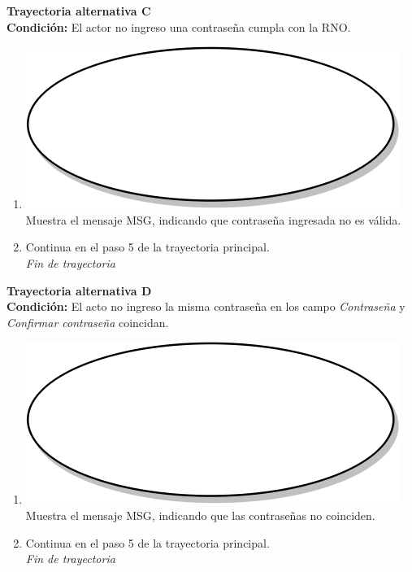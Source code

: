 \textbf{Trayectoria alternativa C} \label{cu2_ta_c}\\
\textbf{Condición:} El actor no ingreso una contraseña cumpla con la RNO.\\
 \begin{enumerate}[label=C\arabic*]
    \item {\includegraphics[scale=.05]{Capitulo3/img/proceso.png} Muestra el mensaje MSG, indicando que contraseña ingresada no es válida.}
    \item {Continua en el paso 5 de la trayectoria principal.} \\
    \textit{Fin de trayectoria} \\
\end{enumerate}

\textbf{Trayectoria alternativa D} \label{cu2_ta_d}\\
\textbf{Condición:} El acto no ingreso la misma contraseña en los campo \textit{Contraseña} y \textit{Confirmar contraseña} coincidan.\\
 \begin{enumerate}[label=D\arabic*]
    \item {\includegraphics[scale=.05]{Capitulo3/img/proceso.png} Muestra el mensaje MSG, indicando que las contraseñas no coinciden.}
    \item {Continua en el paso 5 de la trayectoria principal.} \\
    \textit{Fin de trayectoria} \\
\end{enumerate}


